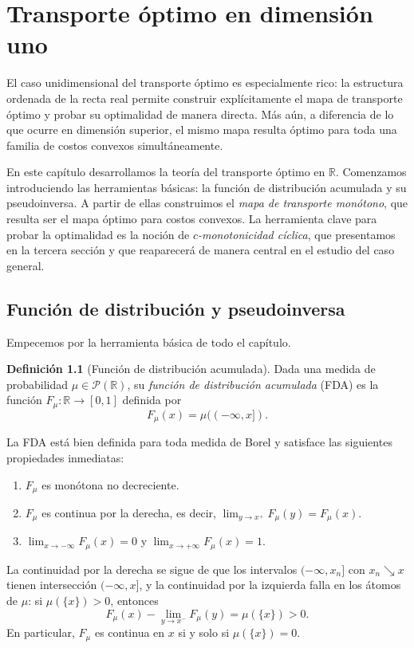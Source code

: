 \documentclass[12pt, a4paper]{amsbook}
\newcommand{\R}{{\mathbb R}}
\theoremstyle{remark}
\theoremstyle{definition}
\newtheorem{defi}[teo]{Definición}
\numberwithin{section}{chapter}
\numberwithin{subsection}{section}
\numberwithin{equation}{section}
\numberwithin{figure}{chapter}
\begin{document}
\chapter{Transporte óptimo en dimensión uno}\label{cap.1D}

El caso unidimensional del transporte óptimo es especialmente rico: la estructura
ordenada de la recta real permite construir explícitamente el mapa de transporte óptimo
y probar su optimalidad de manera directa. Más aún, a diferencia de lo que ocurre
en dimensión superior, el mismo mapa resulta óptimo para toda una familia de costos
convexos simultáneamente.

En este capítulo desarrollamos la teoría del transporte óptimo en $\R$. Comenzamos
introduciendo las herramientas básicas: la función de distribución acumulada y
su pseudoinversa. A partir de ellas construimos el \emph{mapa de transporte monótono},
que resulta ser el mapa óptimo para costos convexos. La herramienta clave para probar
la optimalidad es la noción de \emph{$c$-monotonicidad cíclica}, que presentamos en
la tercera sección y que reaparecerá de manera central en el estudio del caso general.

\section{Función de distribución y pseudoinversa}

Empecemos por la herramienta básica de todo el capítulo.
\begin{defi}[Función de distribución acumulada]
Dada una medida de probabilidad $\mu\in\mathcal P(\R)$, su \emph{función de
distribución acumulada} (FDA) es la función $F_\mu\colon\R\to[0,1]$ definida por
\[
F_\mu(x)=\mu((-\infty,x]).
\]
\end{defi}

La FDA está bien definida para toda medida de Borel y satisface las siguientes
propiedades inmediatas:
\begin{enumerate}
\item $F_\mu$ es monótona no decreciente.
\item $F_\mu$ es continua por la derecha, es decir,
$\lim_{y\to x^+}F_\mu(y)=F_\mu(x)$.
\item $\lim_{x\to-\infty}F_\mu(x)=0$ y $\lim_{x\to+\infty}F_\mu(x)=1$.
\end{enumerate}
La continuidad por la derecha se sigue de que los intervalos $(-\infty,x_n]$
con $x_n\searrow x$ tienen intersección $(-\infty,x]$, y la continuidad por la izquierda
falla en los átomos de $\mu$: si $\mu(\{x\})>0$, entonces
\[
F_\mu(x)-\lim_{y\to x^-}F_\mu(y)=\mu(\{x\})>0.
\]
En particular, $F_\mu$ es continua en $x$ si y solo si $\mu(\{x\})=0$.
\end{document}

